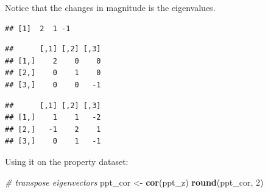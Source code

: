 \documentclass[]{article}
\newenvironment{Shaded}{\begin{snugshade}}{\end{snugshade}}
\newcommand{\CommentTok}[1]{\textcolor[rgb]{0.56,0.35,0.01}{\textit{#1}}}
\newcommand{\DecValTok}[1]{\textcolor[rgb]{0.00,0.00,0.81}{#1}}
\newcommand{\KeywordTok}[1]{\textcolor[rgb]{0.13,0.29,0.53}{\textbf{#1}}}
\newcommand{\NormalTok}[1]{#1}
\newcommand{\OperatorTok}[1]{\textcolor[rgb]{0.81,0.36,0.00}{\textbf{#1}}}
\newcommand{\StringTok}[1]{\textcolor[rgb]{0.31,0.60,0.02}{#1}}
\begin{document}
Notice that the changes in magnitude is the eigenvalues.

\begin{Shaded}
\end{Shaded}

\begin{verbatim}
## [1]  2  1 -1
\end{verbatim}

\begin{Shaded}
\end{Shaded}

\begin{verbatim}
##      [,1] [,2] [,3]
## [1,]    2    0    0
## [2,]    0    1    0
## [3,]    0    0   -1
\end{verbatim}

\begin{Shaded}
\end{Shaded}

\begin{verbatim}
##      [,1] [,2] [,3]
## [1,]    1    1   -2
## [2,]   -1    2    1
## [3,]    0    1   -1
\end{verbatim}

Using it on the property dataset:

\begin{Shaded}
\begin{Highlighting}[]
\CommentTok{# transpose eigenvectors}
\NormalTok{ppt_cor <-}\StringTok{ }\KeywordTok{cor}\NormalTok{(ppt_z)}
\KeywordTok{round}\NormalTok{(ppt_cor, }\DecValTok{2}\NormalTok{)}
\end{Highlighting}
\end{Shaded}
\end{document}

